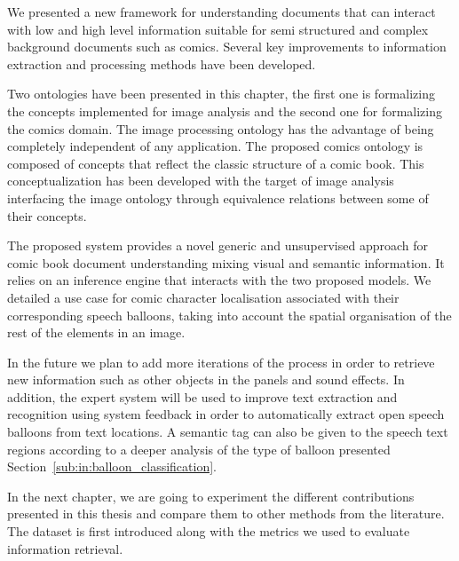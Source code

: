 We presented a new framework for understanding documents that can interact with low and high level information suitable for semi structured and complex background documents such as comics.
Several key improvements to information extraction and processing methods have been developed. 

Two ontologies have been presented in this chapter, the first one is formalizing the concepts implemented for image analysis and the second one for formalizing the comics domain.
The image processing ontology has the advantage of being completely independent of any application.
The proposed comics ontology is composed of concepts that reflect the classic structure of a comic book.
This conceptualization has been developed with the target of image analysis interfacing the image ontology through equivalence relations between some of their concepts.

The proposed system provides a novel generic and unsupervised approach for comic book document understanding mixing visual and semantic information.
It relies on an inference engine that interacts with the two proposed models.
We detailed a use case for comic character localisation associated with their corresponding speech balloons, taking into account the spatial organisation of the rest of the elements in an image.

In the future we plan to add more iterations of the process in order to retrieve new information such as other objects in the panels and sound effects.
In addition, the expert system will be used to improve text extraction and recognition using system feedback in order to automatically extract open speech balloons from text locations.
A semantic tag can also be given to the speech text regions according to a deeper analysis of the type of balloon presented Section~\ref{sub:in:balloon_classification}.

In the next chapter, we are going to experiment the different contributions presented in this thesis and compare them to other methods from the literature.
The dataset is first introduced along with the metrics we used to evaluate information retrieval. 

